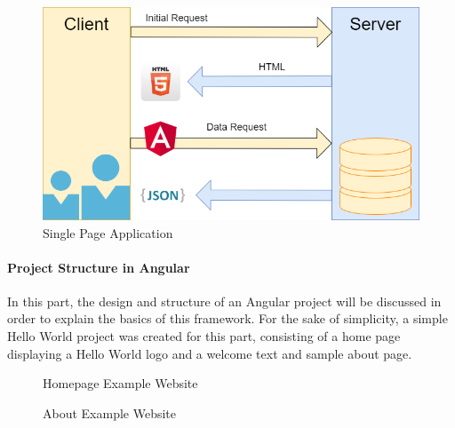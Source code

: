 \begin{figure}[H]
    \centering
    \includegraphics[width=1.0\textwidth]{./images/single_page_app}
    \caption{Single Page Application}
    \label{fig:singpageapp}
\end{figure}

\newpage
\paragraph{Project Structure in Angular}
In this part, the design and structure of an Angular project will be discussed in order to explain the basics of this
framework.
For the sake of simplicity, a simple Hello World project was created for this part, consisting of a home page displaying
a Hello World logo and a welcome text and sample about page.

\begin{figure}[H]
    \centering
    \caption{Homepage Example Website}
    \label{fig:examplehomepage}
\end{figure}

\begin{figure}[H]
    \centering
    \caption{About Example Website}
    \label{fig:exampleaboutpage}
\end{figure}

